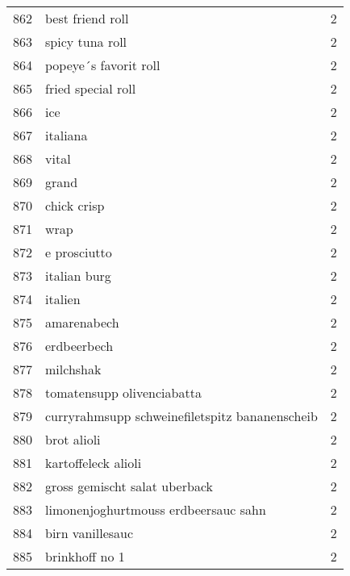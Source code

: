 \begin{tabular}{llr}
862  &                                   best friend roll &      2 \\
863  &                                    spicy tuna roll &      2 \\
864  &                              popeye´s favorit roll &      2 \\
865  &                                 fried special roll &      2 \\
866  &                                                ice &      2 \\
867  &                                           italiana &      2 \\
868  &                                              vital &      2 \\
869  &                                              grand &      2 \\
870  &                                        chick crisp &      2 \\
871  &                                               wrap &      2 \\
872  &                                       e prosciutto &      2 \\
873  &                                       italian burg &      2 \\
874  &                                            italien &      2 \\
875  &                                        amarenabech &      2 \\
876  &                                        erdbeerbech &      2 \\
877  &                                          milchshak &      2 \\
878  &                         tomatensupp olivenciabatta &      2 \\
879  &     curryrahmsupp schweinefiletspitz bananenscheib &      2 \\
880  &                                        brot alioli &      2 \\
881  &                                kartoffeleck alioli &      2 \\
882  &                      gross gemischt salat uberback &      2 \\
883  &               limonenjoghurtmouss erdbeersauc sahn &      2 \\
884  &                                   birn vanillesauc &      2 \\
885  &                                     brinkhoff no 1 &      2 \\

\end{tabular}
